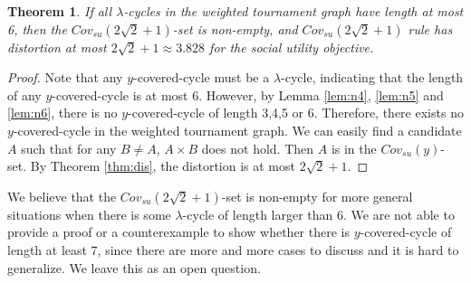 \documentclass[11pt]{article}
\newtheorem{theorem}{Theorem}[section]
\theoremstyle{remark}
\begin{document}
%
%


 \begin{theorem}
 If all $\lambda$-cycles in the weighted tournament graph have length at most 6, then the $Cov_{su}(2\sqrt2+1)$-set is non-empty, and $Cov_{su}(2\sqrt2+1)$ rule has distortion at most $2\sqrt2+1\approx 3.828$ for the social utility objective.
\end{theorem}

\begin{proof}
Note that any $y$-covered-cycle must be a $\lambda$-cycle, indicating that the length of any $y$-covered-cycle is at most 6. However, by Lemma \ref{lem:n4}, \ref{lem:n5} and \ref{lem:n6}, there is no $y$-covered-cycle of length 3,4,5 or 6. Therefore, there exists no $y$-covered-cycle in the weighted tournament graph. We can easily find a candidate $A$ such that for any $B\neq A$, $A\times B$ does not hold. Then $A$ is in the $Cov_{su}(y)$-set. By Theorem \ref{thm:dis}, the distortion is at most $2\sqrt2+1$.
 \end{proof}

We believe that the $Cov_{su}(2\sqrt2+1)$-set is non-empty for more general situations when there is some $\lambda$-cycle of length larger than 6. We are not able to provide a proof or a counterexample to show whether there is $y$-covered-cycle of length at least 7, since there are more and more cases to discuss and it is hard to generalize. We leave this as an open question.
\end{document}
